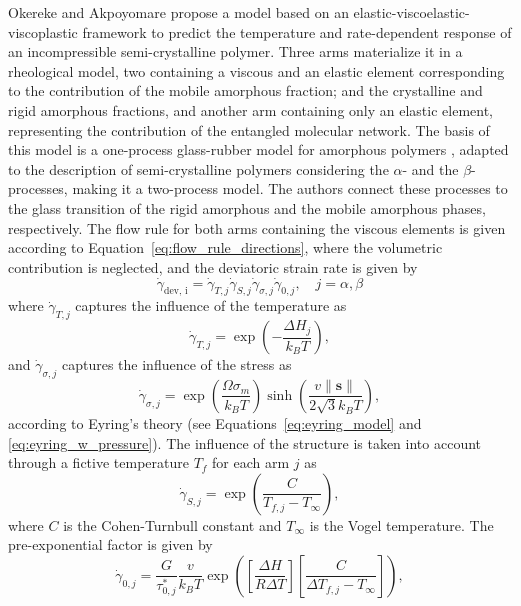 Okereke and Akpoyomare \citep{okerekeTwoprocessConstitutiveModel2019} propose a model based on an elastic-viscoelastic-viscoplastic framework to predict the temperature and rate-dependent response of an incompressible semi-crystalline polymer.
Three arms materialize it in a rheological model, two containing a viscous and an elastic element corresponding to the contribution of the mobile amorphous fraction; and the crystalline and rigid amorphous fractions, and another arm containing only an elastic element, representing the contribution of the entangled molecular network.
The basis of this model is a one-process glass-rubber model for amorphous polymers \citep{buckleyGlassrubberConstitutiveModel1995}, adapted to the description of semi-crystalline polymers considering the $\alpha$- and the $\beta$-processes, making it a two-process model.
The authors connect these processes to the glass transition of the rigid amorphous and the mobile amorphous phases, respectively.
The flow rule for both arms containing the viscous elements is given according to Equation~\eqref{eq:flow_rule_directions}, where the volumetric contribution is neglected, and the deviatoric strain rate is given by
\begin{equation}
	\dot \gamma_\text{dev, i} = \dot \gamma_{T,j}\dot\gamma_{S,j}\dot\gamma_{\sigma,j}\dot\gamma_{0,j},\quad j=\alpha, \beta
\end{equation}
where $\dot \gamma_{T,j}$ captures the influence of the temperature as
\begin{equation}
	\dot \gamma_{T,j} = \exp\left(-\frac{\Delta H_j}{k_B T}\right),
\end{equation}
and $\dot \gamma_{\sigma,j}$ captures the influence of the stress as
\begin{equation}
	\dot\gamma_{\sigma,j} = \exp\left(\frac{\Omega\sigma_m}{k_B T}\right)\sinh\left(\frac{v\|\mathbf s\|}{2\sqrt{3}k_BT}\right),
\end{equation}
according to Eyring's theory (see Equations~\eqref{eq:eyring_model} and \eqref{eq:eyring_w_pressure}).
The influence of the structure is taken into account through a fictive temperature $T_f$ for each arm $j$ as
\begin{equation}
	\dot\gamma_{S,j} = \exp\left(\frac{C}{T_{f,j}-T_\infty}\right),
\end{equation}
where $C$ is the Cohen-Turnbull constant and $T_\infty$ is the Vogel temperature.
The pre-exponential factor is given by
\begin{equation}
	\dot \gamma_{0,j} = \frac{G}{\tau^*_{0,j}} \frac{v}{k_B T}\exp\left(\left[\frac{\Delta H}{R\Delta T}\right]\left[\frac{C}{\Delta T_{f,j} - T_\infty}\right]\right),
\end{equation}
